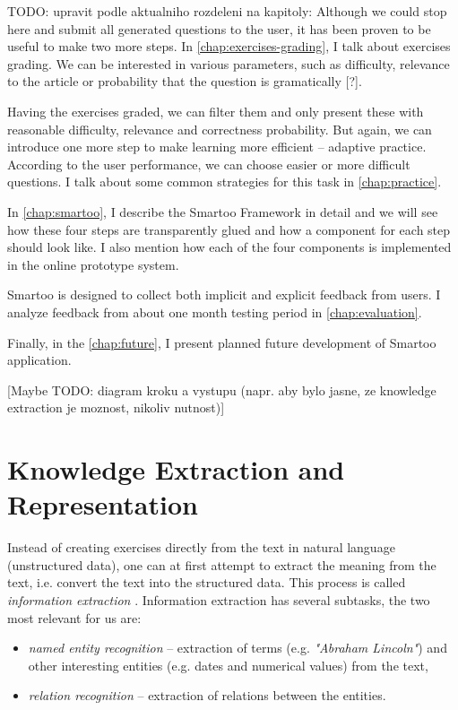 \documentclass[a4paper, 12pt, twoside]{fithesis2}		%
\renewcommand{\_}{\leavevmode \kern0.07em\vbox{\hrule width0.4em}}
\newcommand{\squarebullet}{\textcolor{black}{\raisebox{0.15em}{\rule{4pt}{4pt}}}}
\newenvironment{myItemize}{
  \begin{itemize}[leftmargin=2em,rightmargin=1em,itemsep=\parskip ,parsep=0em,topsep=0em,partopsep=0em]
  \renewcommand{\labelitemi}{\squarebullet}
  \renewcommand{\labelitemii}{$\diamond$}
}{
  \end{itemize}
}
\begin{document}
TODO: upravit podle aktualniho rozdeleni na kapitoly: Although we could stop here and submit all generated questions to the user, it has been proven to be useful to make two more steps.
In \autoref{chap:exercises-grading}, I talk about exercises grading.
We can be interested in various parameters, such as difficulty, relevance to the article or probability that the question is gramatically [?].

Having the exercises graded, we can filter them and only present these with reasonable difficulty, relevance and correctness probability.
But again, we can introduce one more step to make learning more efficient -- adaptive practice.
According to the user performance, we can choose easier or more difficult questions. I talk about some common strategies for this task in \autoref{chap:practice}.

In \autoref{chap:smartoo}, I describe the Smartoo Framework in detail
and we will see how these four steps are transparently glued and how a component for each step should look like.
I also mention how each of the four components is implemented in the online prototype system.

Smartoo is designed to collect both implicit and explicit feedback from users.
I analyze feedback from about one month testing period in \autoref{chap:evaluation}.

Finally, in the \autoref{chap:future}, I present planned future development of Smartoo application.




[Maybe TODO: diagram kroku a vystupu (napr. aby bylo jasne, ze knowledge extraction je moznost, nikoliv nutnost)]



\chapter{Knowledge Extraction and Representation}
\label{chap:knowledge}

Instead of creating exercises directly from the text in natural language (unstructured data),
one can at first attempt to extract the meaning from the text,
i.e. convert the text into the structured data.
This process is called \textit{information extraction} \cite[][262]{nlp-python}.
Information extraction has several subtasks, the two most relevant for us are:
\begin{myItemize}
  \item \textit{named entity recognition} -- extraction of terms (e.g. \textit{"Abraham Lincoln"}) and other interesting entities (e.g. dates and numerical values) from the text,
\item \textit{relation recognition} -- extraction of relations between the entities.
\end{myItemize}
\end{document}

